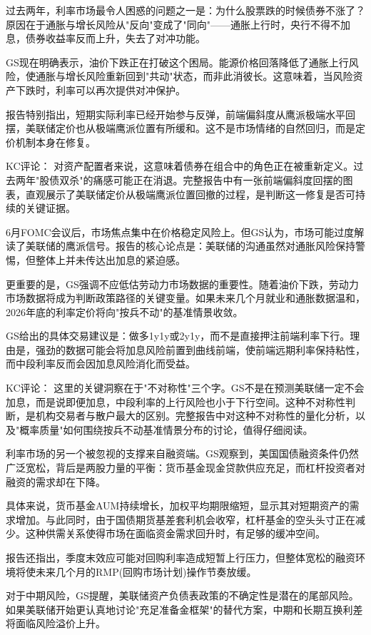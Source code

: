 \documentclass[11pt]{ctexart}
\begin{document}
过去两年，利率市场最令人困惑的问题之一是：为什么股票跌的时候债券不涨了？原因在于通胀与增长风险从"反向"变成了"同向"——通胀上行时，央行不得不加息，债券收益率反而上升，失去了对冲功能。

GS现在明确表示，油价下跌正在打破这个困局。能源价格回落降低了通胀上行风险，使通胀与增长风险重新回到"共动"状态，而非此消彼长。这意味着，当风险资产下跌时，利率可以再次提供对冲保护。

报告特别指出，短期实际利率已经开始参与反弹，前端偏斜度从鹰派极端水平回摆，美联储定价也从极端鹰派位置有所缓和。这不是市场情绪的自然回归，而是定价机制本身在修复。

KC评论： 对资产配置者来说，这意味着债券在组合中的角色正在被重新定义。过去两年"股债双杀"的痛感可能正在消退。完整报告中有一张前端偏斜度回摆的图表，直观展示了美联储定价从极端鹰派位置回撤的过程，是判断这一修复是否可持续的关键证据。

6月FOMC会议后，市场焦点集中在价格稳定风险上。但GS认为，市场可能过度解读了美联储的鹰派信号。报告的核心论点是：美联储的沟通虽然对通胀风险保持警惕，但整体上并未传达出加息的紧迫感。

更重要的是，GS强调不应低估劳动力市场数据的重要性。随着油价下跌，劳动力市场数据将成为判断政策路径的关键变量。如果未来几个月就业和通胀数据温和，2026年底的利率定价将向"按兵不动"的基准情景收敛。

GS给出的具体交易建议是：做多1y1y或2y1y，而不是直接押注前端利率下行。理由是，强劲的数据可能会将加息风险前置到曲线前端，使前端远期利率保持粘性，而中段利率反而会因加息风险消化而受益。

KC评论： 这里的关键洞察在于"不对称性"三个字。GS不是在预测美联储一定不会加息，而是说即便加息，中段利率的上行风险也小于下行空间。这种不对称性判断，是机构交易者与散户最大的区别。完整报告中对这种不对称性的量化分析，以及"概率质量"如何围绕按兵不动基准情景分布的讨论，值得仔细阅读。

利率市场的另一个被忽视的支撑来自融资端。GS观察到，美国国债融资条件仍然广泛宽松，背后是两股力量的平衡：货币基金现金贷款供应充足，而杠杆投资者对融资的需求却在下降。

具体来说，货币基金AUM持续增长，加权平均期限缩短，显示其对短期资产的需求增加。与此同时，由于国债期货基差套利机会收窄，杠杆基金的空头头寸正在减少。这种供需关系使得市场在面临资金需求回升时，有足够的缓冲空间。

报告还指出，季度末效应可能对回购利率造成短暂上行压力，但整体宽松的融资环境将使未来几个月的RMP(回购市场计划)操作节奏放缓。

对于中期风险，GS提醒，美联储资产负债表政策的不确定性是潜在的尾部风险。如果美联储开始更认真地讨论"充足准备金框架"的替代方案，中期和长期互换利差将面临风险溢价上升。
\end{document}
